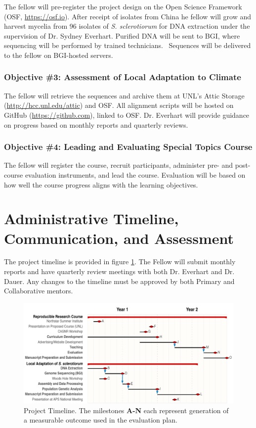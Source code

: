 \documentclass[12pt,letterpaper]{article}
\begin{document}
The fellow will pre-register the project design on the Open Science Framework (OSF, \url{https://osf.io}).
After receipt of isolates from China he fellow will grow and harvest mycelia from 96 isolates of \textit{S. sclerotiorum} for DNA extraction under the supervision of Dr. Sydney Everhart. 
Purified DNA will be sent to BGI, where sequencing will be performed by trained technicians. \
Sequences will be delivered to the fellow on BGI-hosted servers.

\subsubsection*{Objective \#3: Assessment of Local Adaptation to Climate}

The fellow will retrieve the sequences and archive them at UNL's Attic Storage (\url{http://hcc.unl.edu/attic}) and OSF. 
All alignment scripts will be hosted on GitHub (\url{https://github.com}), linked to OSF. Dr. 
Everhart will provide guidance on progress based on monthly reports and quarterly reviews.

\subsubsection*{Objective \#4: Leading and Evaluating Special Topics Course}

The fellow will register the course, recruit participants, administer pre- and post- course evaluation instruments, and lead the course. 
Evaluation will be based on how well the course progress aligns with the learning objectives. 

\section{Administrative Timeline, Communication, and Assessment}

The project timeline is provided in figure \ref{fig:timeline}. 
The Fellow will submit monthly reports and have quarterly review meetings with both Dr. Everhart and Dr. Dauer. 
Any changes to the timeline must be approved by both Primary and Collaborative mentors. 

\begin{figure}[!htbp]
  \centering
  \includegraphics[width=\textwidth]{packet/timeline.pdf}
  \caption{Project Timeline. The milestones \textbf{A-N} each represent generation of a measurable outcome used in the evaluation plan.}
  \label{fig:timeline}
\end{figure}
\end{document}
